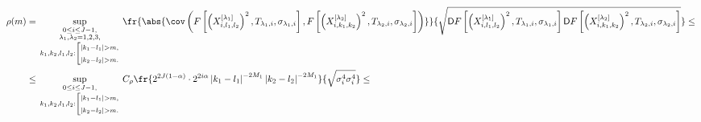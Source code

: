 \begin{align}


\rho(m)


&=\sup\limits_{{\begin{smallmatrix}0\leq i\leq J-1,\\


\lambda_1, \lambda_2= 1,2,3, \\


k_1,k_2,l_1,l_2:\left[ \begin{gathered}{\scriptstyle |k_1-l_1|>m,}\\


  {\scriptstyle |k_2-l_2|>m.}\end{gathered} \right.\end{smallmatrix}}}


   \fr{\abs{\cov\left(F\left[\left(X_{i,l_1,l_2}^{[\lambda_1]}\right)^2,


   T_{\lambda_1,i},\sigma_{\lambda_1,i}\right],F\left[\left(X_{i,k_1,k_2}^{[\lambda_2]}\right)^2,


   T_{\lambda_2,i},\sigma_{\lambda_2,i}\right]\right)}}


   {\sqrt{\Variance F\left[\left(X_{i,l_1,l_2}^{[\lambda_1]}\right)^2,


   T_{\lambda_1,i},\sigma_{\lambda_1,i}\right]


   \Variance F\left[\left(X_{i,k_1,k_2}^{[\lambda_2]}\right)^2,T_{\lambda_2,i},


   \sigma_{\lambda_2,i}\right]}}\leq{}\notag\\


&\leq \sup\limits_{{\begin{smallmatrix}0\leq i\leq


J-1,\\k_1,k_2,l_1,l_2:\left[ \begin{gathered}


{\scriptstyle |k_1-l_1|>m,}\\


{\scriptstyle |k_2-l_2|>m.}


\end{gathered} \right.\end{smallmatrix}}}


C_\rho\fr{2^{2J(1-\alpha)}\cdot2^{2i\alpha}\left\vert k_1-l_1\right\vert^{-2M_1}


\left\vert k_2-l_2\right\vert^{-2M_1}}


{\sqrt{\sigma^4_i\sigma^4_i}}\leq{}\notag\\



\end{align}

